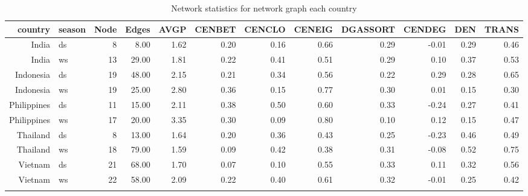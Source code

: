 \begin{table}[ht]
\centering
\begin{tabular}{rlrrrrrrrrrr}
  \hline
 country & season & Node & Edges & AVGP & CENBET & CENCLO & CENEIG & DGASSORT & CENDEG & DEN & TRANS \\ 
  \hline
  India & ds &   8 & 8.00 & 1.62 & 0.20 & 0.16 & 0.66 & 0.29 & -0.01 & 0.29 & 0.46 \\ 
  India & ws &  13 & 29.00 & 1.81 & 0.22 & 0.41 & 0.51 & 0.29 & 0.10 & 0.37 & 0.53 \\ 
  Indonesia & ds &  19 & 48.00 & 2.15 & 0.21 & 0.34 & 0.56 & 0.22 & 0.29 & 0.28 & 0.65 \\ 
  Indonesia & ws &  19 & 25.00 & 2.80 & 0.36 & 0.15 & 0.77 & 0.30 & 0.01 & 0.15 & 0.30 \\ 
  Philippines & ds &  11 & 15.00 & 2.11 & 0.38 & 0.50 & 0.60 & 0.33 & -0.24 & 0.27 & 0.41 \\ 
  Philippines & ws &  17 & 20.00 & 3.35 & 0.30 & 0.09 & 0.80 & 0.10 & 0.12 & 0.15 & 0.47 \\ 
  Thailand & ds &   8 & 13.00 & 1.64 & 0.20 & 0.36 & 0.43 & 0.25 & -0.23 & 0.46 & 0.49 \\ 
  Thailand & ws &  18 & 79.00 & 1.59 & 0.09 & 0.42 & 0.38 & 0.31 & -0.08 & 0.52 & 0.75 \\ 
  Vietnam & ds &  21 & 68.00 & 1.70 & 0.07 & 0.10 & 0.55 & 0.33 & 0.11 & 0.32 & 0.56 \\ 
  Vietnam & ws &  22 & 58.00 & 2.09 & 0.22 & 0.40 & 0.61 & 0.32 & -0.01 & 0.25 & 0.42 \\ 
   \hline
       \caption{Network statistics for network graph each country}
\label{table:Network_stat}
\end{tabular}
\end{table}